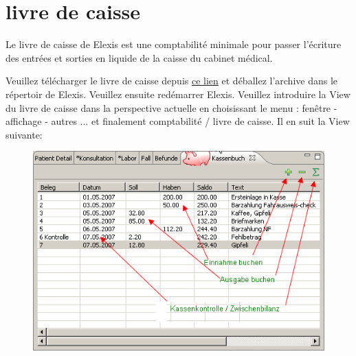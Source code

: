 
\section{livre de caisse} \label{Kassenbuch}
Le livre de caisse de Elexis est une comptabilité minimale pour passer l'écriture des entrées et sorties en liquide de la caisse du cabinet médical.

 Veuillez télécharger le livre de caisse depuis \href{http://www.rgw.ch/download.php?file=elexis-kassenbuch}{ce lien} et déballez l'archive dans le répertoir de Elexis. Veuillez ensuite redémarrer Elexis.
Veuillez introduire la View du livre de caisse dans la perspective actuelle en choisissant le menu : fenêtre - affichage - autres  ... et finalement comptabilité / livre de caisse. Il en suit la View suivante:
\begin{figure}[htp]
\begin{center}
  \includegraphics{images/kassenbuch}
  \label{fig:kassenbuch}
\end{center}
\end{figure}

